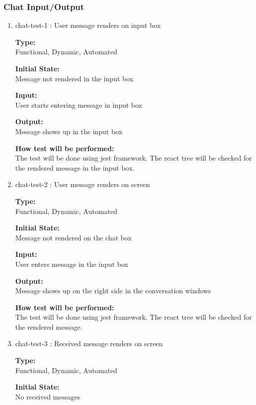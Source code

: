 \documentclass[12pt, titlepage]{article}
\begin{document}
\subsubsection{Chat Input/Output}
\begin{enumerate}
   \item{chat-test-1 : User message renders on input box\\}

\textbf{Type:}\\ Functional, Dynamic, Automated 
					
\textbf{Initial State:}\\ Message not rendered in the input box 
					
\textbf{Input:}\\ User starts entering message in input box
					
\textbf{Output:}\\ Message shows up in the input box
					
\textbf{How test will be performed:}\\ 
The test will be done using jest framework. The react tree will be checked for the rendered message in the input box.

\item{chat-test-2 : User message renders on screen\\}

\textbf{Type:}\\ Functional, Dynamic, Automated 
					
\textbf{Initial State:}\\ Message not rendered on the chat box
					
\textbf{Input:}\\ User enters message in the input box
					
\textbf{Output:}\\ Message shows up on the right side in the conversation windows
					
\textbf{How test will be performed:}\\ 
The test will be done using jest framework. The react tree will be checked for the rendered message.

\item{chat-test-3 : Received message renders on screen\\}

\textbf{Type:}\\ Functional, Dynamic, Automated 
					
\textbf{Initial State:}\\ No received messages
					

\end{enumerate}
\end{document}
